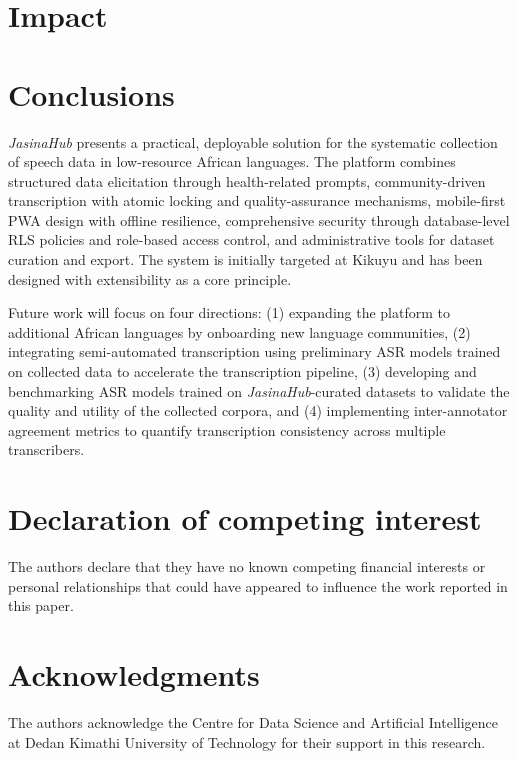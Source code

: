 \documentclass[final,5p,times,twocolumn]{elsarticle}
\begin{document}
\section{Impact}


\section{Conclusions}

\emph{JasinaHub} presents a practical, deployable solution for the systematic collection of speech data in low-resource African languages. The platform combines structured data elicitation through health-related prompts, community-driven transcription with atomic locking and quality-assurance mechanisms, mobile-first PWA design with offline resilience, comprehensive security through database-level RLS policies and role-based access control, and administrative tools for dataset curation and export. The system is initially targeted at Kikuyu and has been designed with extensibility as a core principle.

Future work will focus on four directions: (1) expanding the platform to additional African languages by onboarding new language communities, (2) integrating semi-automated transcription using preliminary ASR models trained on collected data to accelerate the transcription pipeline, (3) developing and benchmarking ASR models trained on \emph{JasinaHub}-curated datasets to validate the quality and utility of the collected corpora, and (4) implementing inter-annotator agreement metrics to quantify transcription consistency across multiple transcribers.

\section*{Declaration of competing interest}
The authors declare that they have no known competing financial interests or personal relationships that could have appeared to influence the work reported in this paper.

\section*{Acknowledgments}
The authors acknowledge the Centre for Data Science and Artificial Intelligence at Dedan Kimathi University of Technology for their support in this research.



\end{document}
